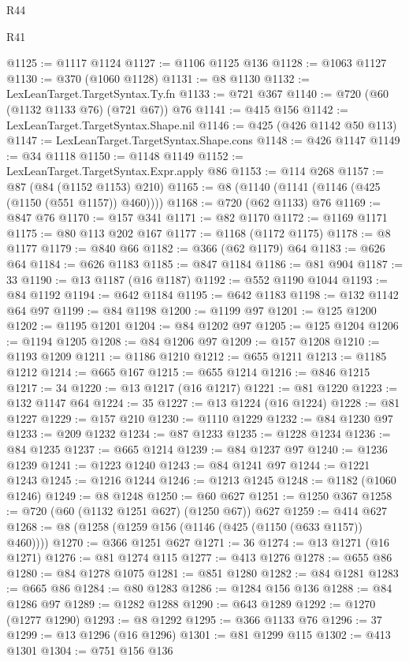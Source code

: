 \begin{lexlean}{R44}
\begin{lexlean}{R41}
\begin{coremodule}
{{{{{{{{{{{{{{{{{{{{{{{{{{{{{{{{{{{{{{{{{{{{{{{{{{{{{{{{{{{{{{{{{{{{{{{{{{{{{{{{{{{{{{{@1125 := @1117 @1124
@1127 := @1106 @1125 @136
@1128 := @1063 @1127
@1130 := @370 (@1060 @1128)
@1131 := @8 @1130
@1132 := LexLeanTarget.TargetSyntax.Ty.fn
@1133 := @721 @367
@1140 := @720 (@60 (@1132 @1133 @76) (@721 @67)) @76
@1141 := @415 @156
@1142 := LexLeanTarget.TargetSyntax.Shape.nil
@1146 := @425 (@426 @1142 @50 @113)
@1147 := LexLeanTarget.TargetSyntax.Shape.cons
@1148 := @426 @1147
@1149 := @34 @1118
@1150 := @1148 @1149
@1152 := LexLeanTarget.TargetSyntax.Expr.apply @86
@1153 := @114 @268
@1157 := @87 (@84 (@1152 @1153) @210)
@1165 := @8 (@1140 (@1141 (@1146 (@425 (@1150 (@551 @1157)) @460))))
@1168 := @720 (@62 @1133) @76
@1169 := @847 @76
@1170 := @157 @341
@1171 := @82 @1170
@1172 := @1169 @1171
@1175 := @80 @113 @202 @167
@1177 := @1168 (@1172 @1175)
@1178 := @8 @1177
@1179 := @840 @66
@1182 := @366 (@62 @1179) @64
@1183 := @626 @64
@1184 := @626 @1183
@1185 := @847 @1184
@1186 := @81 @904
@1187 := 33
@1190 := @13 @1187 (@16 @1187)
@1192 := @552 @1190 @1044
@1193 := @84 @1192
@1194 := @642 @1184
@1195 := @642 @1183
@1198 := @132 @1142 @64 @97
@1199 := @84 @1198
@1200 := @1199 @97
@1201 := @125 @1200
@1202 := @1195 @1201
@1204 := @84 @1202 @97
@1205 := @125 @1204
@1206 := @1194 @1205
@1208 := @84 @1206 @97
@1209 := @157 @1208
@1210 := @1193 @1209
@1211 := @1186 @1210
@1212 := @655 @1211
@1213 := @1185 @1212
@1214 := @665 @167
@1215 := @655 @1214
@1216 := @846 @1215
@1217 := 34
@1220 := @13 @1217 (@16 @1217)
@1221 := @81 @1220
@1223 := @132 @1147 @64
@1224 := 35
@1227 := @13 @1224 (@16 @1224)
@1228 := @81 @1227
@1229 := @157 @210
@1230 := @1110 @1229
@1232 := @84 @1230 @97
@1233 := @209 @1232
@1234 := @87 @1233
@1235 := @1228 @1234
@1236 := @84 @1235
@1237 := @665 @1214
@1239 := @84 @1237 @97
@1240 := @1236 @1239
@1241 := @1223 @1240
@1243 := @84 @1241 @97
@1244 := @1221 @1243
@1245 := @1216 @1244
@1246 := @1213 @1245
@1248 := @1182 (@1060 @1246)
@1249 := @8 @1248
@1250 := @60 @627
@1251 := @1250 @367
@1258 := @720 (@60 (@1132 @1251 @627) (@1250 @67)) @627
@1259 := @414 @627
@1268 := @8 (@1258 (@1259 @156 (@1146 (@425 (@1150 (@633 @1157)) @460))))
@1270 := @366 @1251 @627
@1271 := 36
@1274 := @13 @1271 (@16 @1271)
@1276 := @81 @1274 @115
@1277 := @413 @1276
@1278 := @655 @86
@1280 := @84 @1278 @1075
@1281 := @851 @1280
@1282 := @84 @1281
@1283 := @665 @86
@1284 := @80 @1283
@1286 := @1284 @156 @136
@1288 := @84 @1286 @97
@1289 := @1282 @1288
@1290 := @643 @1289
@1292 := @1270 (@1277 @1290)
@1293 := @8 @1292
@1295 := @366 @1133 @76
@1296 := 37
@1299 := @13 @1296 (@16 @1296)
@1301 := @81 @1299 @115
@1302 := @413 @1301
@1304 := @751 @156 @136
}}}}}}}}}}}}}}}}}}}}}}}}}}}}}}}}}}}}}}}}}}}}}}}}}}}}}}}}}}}}}}}}}}}}}}}}}}}}}}}}}}}}}}}
\end{coremodule}
\end{lexlean}
\end{lexlean}
